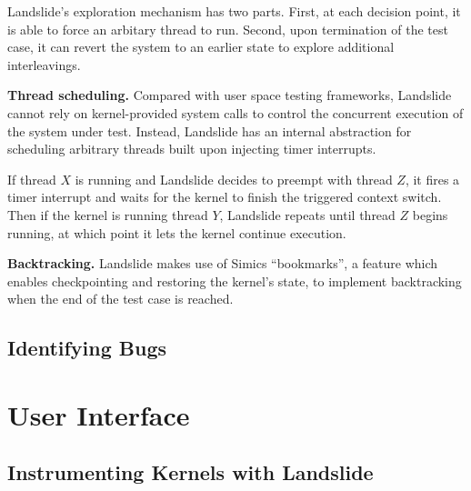 \documentclass{llncs}
\begin{document}
Landslide's exploration mechanism has two parts. First, at each decision point, it is able to force an arbitary thread to run. Second, upon termination of the test case, it can revert the system to an earlier state to explore additional interleavings.

{\bf Thread scheduling.} Compared with user space testing frameworks, Landslide cannot rely on kernel-provided system calls to control the concurrent execution of the system under test. Instead, Landslide has an internal abstraction for scheduling arbitrary threads built upon injecting timer interrupts.

If thread $X$ is running and Landslide decides to preempt with thread $Z$, it fires a timer interrupt and waits for the kernel to finish the triggered context switch. Then if the kernel is running thread $Y$, Landslide repeats until thread $Z$ begins running, at which point it lets the kernel continue execution.

{\bf Backtracking.} Landslide makes use of Simics ``bookmarks'', a feature
which enables checkpointing and restoring the kernel's state, to implement
backtracking when the end of the test case is reached.

\subsection{Identifying Bugs}


\section{User Interface}
\label{sec:interface}


\subsection{Instrumenting Kernels with Landslide}
\label{sec:instrument}
\end{document}
